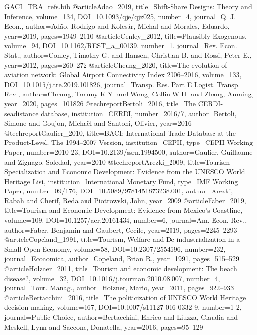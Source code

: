 \begin{filecontents*}[overwrite]{GACI_TRA_refs.bib}
@article{Adao_2019, title={Shift-Share Designs: Theory and Inference}, volume={134}, DOI={10.1093/qje/qjz025}, number={4}, journal={Q. J. Econ.}, author={Ad\~ao, Rodrigo and Koles\'ar, Michal and Morales, Eduardo}, year={2019}, pages={1949--2010} }
@article{Conley_2012, title={Plausibly Exogenous}, volume={94}, DOI={10.1162/REST_a_00139}, number={1}, journal={Rev. Econ. Stat.}, author={Conley, Timothy G. and Hansen, Christian B. and Rossi, Peter E.}, year={2012}, pages={260--272} }
@article{Cheung_2020, title={The evolution of aviation network: {Global Airport Connectivity Index} 2006--2016}, volume={133}, DOI={10.1016/j.tre.2019.101826}, journal={Transp. Res. Part E Logist. Transp. Rev.}, author={Cheung, Tommy K.Y. and Wong, Collin W.H. and Zhang, Anming}, year={2020}, pages={101826} }
@techreport{Bertoli_2016, title={The {CERDI}-seadistance database}, institution={CERDI}, number={2016/7}, author={Bertoli, Simone and Goujon, Micha\"el and Santoni, Olivier}, year={2016} }
@techreport{Gaulier_2010, title={{BACI}: International Trade Database at the Product-Level. {The} 1994--2007 Version}, institution={CEPII}, type={CEPII Working Paper}, number={2010-23}, DOI={10.2139/ssrn.1994500}, author={Gaulier, Guillaume and Zignago, Soledad}, year={2010} }
@techreport{Arezki_2009, title={Tourism Specialization and Economic Development: Evidence from the {UNESCO} {World Heritage List}}, institution={International Monetary Fund}, type={IMF Working Paper}, number={09/176}, DOI={10.5089/9781451873238.001}, author={Arezki, Rabah and Cherif, Reda and Piotrowski, John}, year={2009} }
@article{Faber_2019, title={Tourism and Economic Development: Evidence from {Mexico}'s Coastline}, volume={109}, DOI={10.1257/aer.20161434}, number={6}, journal={Am. Econ. Rev.}, author={Faber, Benjamin and Gaubert, Cecile}, year={2019}, pages={2245--2293} }
@article{Copeland_1991, title={Tourism, Welfare and De-industrialization in a Small Open Economy}, volume={58}, DOI={10.2307/2554696}, number={232}, journal={Economica}, author={Copeland, Brian R.}, year={1991}, pages={515--529} }
@article{Holzner_2011, title={Tourism and economic development: The beach disease?}, volume={32}, DOI={10.1016/j.tourman.2010.08.007}, number={4}, journal={Tour. Manag.}, author={Holzner, Mario}, year={2011}, pages={922--933} }
@article{Bertacchini_2016, title={The politicization of {UNESCO} {World Heritage} decision making}, volume={167}, DOI={10.1007/s11127-016-0332-9}, number={1-2}, journal={Public Choice}, author={Bertacchini, Enrico and Liuzza, Claudia and Meskell, Lynn and Saccone, Donatella}, year={2016}, pages={95--129} }

\end{filecontents*}
